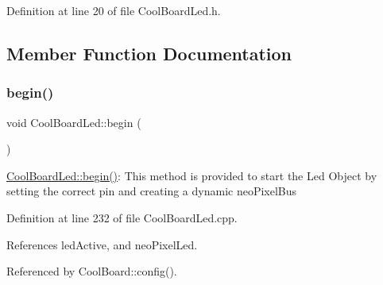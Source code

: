 Definition at line 20 of file Cool\+Board\+Led.\+h.



\subsection{Member Function Documentation}
\mbox{\label{classCoolBoardLed_ae3cbde8affcc6f011cbd698c8ef911f6}} 
\subsubsection{\texorpdfstring{begin()}{begin()}}
{\footnotesize\ttfamily void Cool\+Board\+Led\+::begin (\begin{DoxyParamCaption}{ }\end{DoxyParamCaption})}

\hyperlink{classCoolBoardLed_ae3cbde8affcc6f011cbd698c8ef911f6}{Cool\+Board\+Led\+::begin()}\+: This method is provided to start the Led Object by setting the correct pin and creating a dynamic neo\+Pixel\+Bus 

Definition at line 232 of file Cool\+Board\+Led.\+cpp.



References led\+Active, and neo\+Pixel\+Led.



Referenced by Cool\+Board\+::config().


